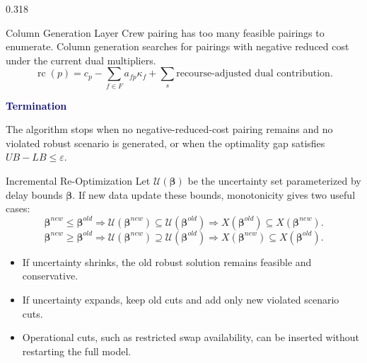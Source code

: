 \documentclass[final]{beamer}
\newcommand{\tightitem}{\setlength{\itemsep}{0.10em}\setlength{\parsep}{0pt}\setlength{\topsep}{0pt}}
\newcommand{\minihead}[1]{\vspace{0.12cm}\textbf{\textcolor{navy}{#1}}\par}
\newcommand{\eqsmall}[1]{\begingroup\scriptsize #1\endgroup}
\begin{document}
\begin{frame}[t]
\begin{minipage}[t]{0.968\textwidth}
\begin{columns}[t,totalwidth=\linewidth]
\begin{column}{0.318\linewidth}
\begin{block}{Column Generation Layer}
Crew pairing has too many feasible pairings to enumerate. Column generation searches for pairings with negative reduced cost under the current dual multipliers.
\eqsmall{
\[
\operatorname{rc}(p)=
c_p-\sum_{f\in F}a_{fp}\kappa_f+
\sum_s \text{recourse-adjusted dual contribution}.
\]
}
\begin{center}
\end{center}
\minihead{Termination}
The algorithm stops when no negative-reduced-cost pairing remains and no violated robust scenario is generated, or when the optimality gap satisfies \(UB-LB\leq\varepsilon\).
\end{block}

\begin{block}{Incremental Re-Optimization}
Let \(\mathcal U(\boldsymbol{\beta})\) be the uncertainty set parameterized by delay bounds \(\boldsymbol{\beta}\). If new data update these bounds, monotonicity gives two useful cases:
\eqsmall{
\[
\boldsymbol{\beta}^{new}\leq \boldsymbol{\beta}^{old}
\Rightarrow
\mathcal U(\boldsymbol{\beta}^{new})\subseteq
\mathcal U(\boldsymbol{\beta}^{old})
\Rightarrow
X(\boldsymbol{\beta}^{old})\subseteq X(\boldsymbol{\beta}^{new}).
\]
\[
\boldsymbol{\beta}^{new}\geq \boldsymbol{\beta}^{old}
\Rightarrow
\mathcal U(\boldsymbol{\beta}^{new})\supseteq
\mathcal U(\boldsymbol{\beta}^{old})
\Rightarrow
X(\boldsymbol{\beta}^{new})\subseteq X(\boldsymbol{\beta}^{old}).
\]
}
\begin{itemize}\tightitem
  \item If uncertainty shrinks, the old robust solution remains feasible and conservative.
  \item If uncertainty expands, keep old cuts and add only new violated scenario cuts.
  \item Operational cuts, such as restricted swap availability, can be inserted without restarting the full model.
\end{itemize}
\end{block}


\end{column}
\end{columns}
\end{minipage}
\end{frame}
\end{document}
